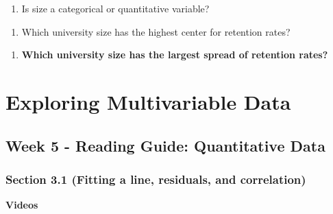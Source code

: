 \documentclass[
]{report}
\providecommand{\tightlist}{%
  \setlength{\itemsep}{0pt}\setlength{\parskip}{0pt}}
\begin{document}
\begin{enumerate}
\def\labelenumi{\arabic{enumi}.}
\setcounter{enumi}{14}
\tightlist
\item
  Is size a categorical or quantitative variable?
\end{enumerate}

\vspace{0.5in}

\begin{enumerate}
\def\labelenumi{\arabic{enumi}.}
\setcounter{enumi}{15}
\tightlist
\item
  Which university size has the highest center for retention rates?
\end{enumerate}

\vspace{0.5in}

\begin{enumerate}
\def\labelenumi{\arabic{enumi}.}
\setcounter{enumi}{16}
\tightlist
\item
  \textbf{Which university size has the largest spread of retention rates?}
\end{enumerate}

\vspace{0.5in}

\newpage

\hypertarget{exploring-multivariable-data}{%
\chapter{Exploring Multivariable Data}\label{exploring-multivariable-data}}

\hypertarget{week-5---reading-guide-quantitative-data}{%
\section{Week 5 - Reading Guide: Quantitative Data}\label{week-5---reading-guide-quantitative-data}}

\hypertarget{section-3.1-fitting-a-line-residuals-and-correlation}{%
\subsection*{Section 3.1 (Fitting a line, residuals, and correlation)}\label{section-3.1-fitting-a-line-residuals-and-correlation}}


\textbf{Videos}
\end{document}

